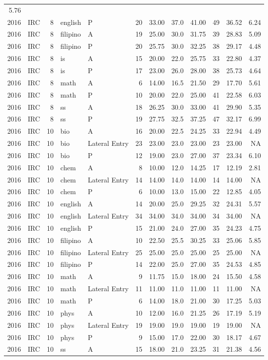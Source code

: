 \documentclass[]{article}
\begin{document}
\begin{longtable}[]{@{}rlrllrrrrrrr@{}}
5.76\tabularnewline
2016 & IRC & 8 & english & P & 20 & 33.00 & 37.0 & 41.00 & 49 & 36.52 &
6.24\tabularnewline
2016 & IRC & 8 & filipino & A & 19 & 25.00 & 30.0 & 31.75 & 39 & 28.83 &
5.09\tabularnewline
2016 & IRC & 8 & filipino & P & 20 & 25.75 & 30.0 & 32.25 & 38 & 29.17 &
4.48\tabularnewline
2016 & IRC & 8 & is & A & 15 & 20.00 & 22.0 & 25.75 & 33 & 22.80 &
4.37\tabularnewline
2016 & IRC & 8 & is & P & 17 & 23.00 & 26.0 & 28.00 & 38 & 25.73 &
4.64\tabularnewline
2016 & IRC & 8 & math & A & 6 & 14.00 & 16.5 & 21.50 & 29 & 17.70 &
5.61\tabularnewline
2016 & IRC & 8 & math & P & 10 & 20.00 & 22.0 & 25.00 & 41 & 22.58 &
6.03\tabularnewline
2016 & IRC & 8 & ss & A & 18 & 26.25 & 30.0 & 33.00 & 41 & 29.90 &
5.35\tabularnewline
2016 & IRC & 8 & ss & P & 19 & 27.75 & 32.5 & 37.25 & 47 & 32.17 &
6.99\tabularnewline
2016 & IRC & 10 & bio & A & 16 & 20.00 & 22.5 & 24.25 & 33 & 22.94 &
4.49\tabularnewline
2016 & IRC & 10 & bio & Lateral Entry & 23 & 23.00 & 23.0 & 23.00 & 23 &
23.00 & NA\tabularnewline
2016 & IRC & 10 & bio & P & 12 & 19.00 & 23.0 & 27.00 & 37 & 23.34 &
6.10\tabularnewline
2016 & IRC & 10 & chem & A & 8 & 10.00 & 12.0 & 14.25 & 17 & 12.19 &
2.81\tabularnewline
2016 & IRC & 10 & chem & Lateral Entry & 14 & 14.00 & 14.0 & 14.00 & 14
& 14.00 & NA\tabularnewline
2016 & IRC & 10 & chem & P & 6 & 10.00 & 13.0 & 15.00 & 22 & 12.85 &
4.05\tabularnewline
2016 & IRC & 10 & english & A & 14 & 20.00 & 25.0 & 29.25 & 32 & 24.31 &
5.57\tabularnewline
2016 & IRC & 10 & english & Lateral Entry & 34 & 34.00 & 34.0 & 34.00 &
34 & 34.00 & NA\tabularnewline
2016 & IRC & 10 & english & P & 15 & 21.00 & 24.0 & 27.00 & 35 & 24.23 &
4.75\tabularnewline
2016 & IRC & 10 & filipino & A & 10 & 22.50 & 25.5 & 30.25 & 33 & 25.06
& 5.85\tabularnewline
2016 & IRC & 10 & filipino & Lateral Entry & 25 & 25.00 & 25.0 & 25.00 &
25 & 25.00 & NA\tabularnewline
2016 & IRC & 10 & filipino & P & 14 & 22.00 & 25.0 & 27.00 & 35 & 24.53
& 4.85\tabularnewline
2016 & IRC & 10 & math & A & 9 & 11.75 & 15.0 & 18.00 & 24 & 15.50 &
4.58\tabularnewline
2016 & IRC & 10 & math & Lateral Entry & 11 & 11.00 & 11.0 & 11.00 & 11
& 11.00 & NA\tabularnewline
2016 & IRC & 10 & math & P & 6 & 14.00 & 18.0 & 21.00 & 30 & 17.25 &
5.03\tabularnewline
2016 & IRC & 10 & phys & A & 10 & 12.00 & 16.0 & 21.25 & 26 & 17.19 &
5.19\tabularnewline
2016 & IRC & 10 & phys & Lateral Entry & 19 & 19.00 & 19.0 & 19.00 & 19
& 19.00 & NA\tabularnewline
2016 & IRC & 10 & phys & P & 9 & 15.00 & 17.0 & 22.00 & 30 & 18.17 &
4.67\tabularnewline
2016 & IRC & 10 & ss & A & 15 & 18.00 & 21.0 & 23.25 & 31 & 21.38 &
4.56\tabularnewline

\end{longtable}
\end{document}
